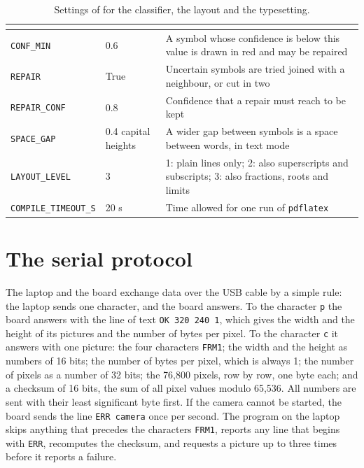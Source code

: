 \begin{table}[H]
\centering
\begin{tabular}{L{3.3cm}C{2.1cm}L{5.7cm}}
\toprule
{} &  &  \\
\midrule
\texttt{CONF\_MIN} & 0.6 & A symbol whose confidence is below this value is drawn in red and
  may be repaired \\
\texttt{REPAIR} & True & Uncertain symbols are tried joined with a neighbour, or cut in two \\
\texttt{REPAIR\_CONF} & 0.8 & Confidence that a repair must reach to be kept \\
\midrule
\texttt{SPACE\_GAP} & 0.4 capital heights & A wider gap between symbols is a space between
  words, in text mode \\
\texttt{LAYOUT\_LEVEL} & 3 & 1: plain lines only; 2: also superscripts and subscripts; 3: also
  fractions, roots and limits \\
\texttt{COMPILE\_\allowbreak TIMEOUT\_S} & 20 s & Time allowed for one run of
  \texttt{pdflatex} \\
\bottomrule
\end{tabular}
\caption{Settings of  for the classifier, the layout and the typesetting.}
\label{tab:config2}
\end{table}

\section{The serial protocol}
\label{sec:protocol}

The laptop and the board exchange data over the USB cable by a simple rule: the laptop sends
one character, and the board answers. To the character \texttt{p} the board answers with the
line of text \texttt{OK 320 240 1}, which gives the width and the height of its pictures and
the number of bytes per pixel. To the character \texttt{c} it answers with one picture: the
four characters \texttt{FRM1}; the width and the height as numbers of 16 bits; the number of
bytes per pixel, which is always 1; the number of pixels as a number of 32 bits; the 76{,}800
pixels, row by row, one byte each; and a checksum of 16 bits, the sum of all pixel values
modulo 65{,}536. All numbers are sent with their least significant byte first. If the camera
cannot be started, the board sends the line \texttt{ERR camera} once per second. The program on
the laptop skips anything that precedes the characters \texttt{FRM1}, reports any line that
begins with \texttt{ERR}, recomputes the checksum, and requests a picture up to three times
before it reports a failure.

